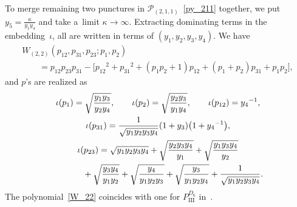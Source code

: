 \documentclass[pdftex]{sigma}
\numberwithin{equation}{section}
\begin{document}
To merge remaining two punctures in $\mathcal{P}_{(2,1,1)}$~\eqref{py_211} together, we put $ y_5 = \frac{\kappa}{y_1 y_4}$ and take a~limit $\kappa\to \infty$. Extracting dominating terms in the embedding~$\iota$, all are written in terms of $(y_1, y_2, y_3, y_4)$. We have
\begin{gather}
 W_{(2,2)}(p_{12}, p_{31}, p_{23}; p_1, p_2)\nonumber \\
 \qquad {}= p_{12} p_{23} p_{31} - \big[ {p_{12}}^2 + {p_{31}}^2 + ( p_1 p_2+ 1 ) p_{12} + ( p_1 + p_2 ) p_{31} + p_1 p_2 \big], \label{W_22}
\end{gather}
 and $p$'s are realized as
\begin{gather}
 \iota(p_1) = \sqrt{\frac{y_1 y_3}{y_2 y_4}} ,\qquad \iota(p_2) = \sqrt{\frac{y_2 y_3}{y_1 y_4}},
\qquad \iota(p_{12}) = {y_4}^{-1} ,\nonumber \\
 \iota(p_{31}) = \frac{1}{\sqrt{y_1 y_2 y_3 y_4}} ( 1 + y_3 ) \big( 1 + {y_4}^{-1} \big) ,\nonumber \\
 \iota(p_{23}) = \sqrt{y_1 y_2 y_3 y_4} +\sqrt{\frac{y_2 y_3 y_4}{y_1}} +\sqrt{\frac{y_1 y_3 y_4}{y_2}}\nonumber \\
\hphantom{\iota(p_{23}) =}{} + \sqrt{\frac{y_3 y_4}{y_1 y_2}} +\sqrt{\frac{y_4}{y_1 y_2 y_3}} + \sqrt{\frac{y_3}{y_1 y_2 y_4}} + \frac{1}{\sqrt{y_1 y_2 y_3 y_4}} . \label{py_22}
\end{gather}
The polynomial~\eqref{W_22} coincides with one for $P_{\mathrm{III}}^{D_6}$ in~\cite{vdPutSaito09a}.
\end{document}
